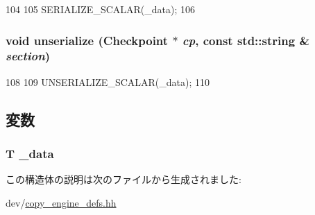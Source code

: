\begin{DoxyCode}
104     {
105         SERIALIZE_SCALAR(_data);
106     }
\end{DoxyCode}
\hypertarget{structCopyEngineReg_1_1Reg_af22e5d6d660b97db37003ac61ac4ee49}{
\subsubsection[{unserialize}]{\setlength{\rightskip}{0pt plus 5cm}void unserialize ({\bf Checkpoint} $\ast$ {\em cp}, \/  const std::string \& {\em section})}}
\label{structCopyEngineReg_1_1Reg_af22e5d6d660b97db37003ac61ac4ee49}



\begin{DoxyCode}
108     {
109         UNSERIALIZE_SCALAR(_data);
110     }
\end{DoxyCode}


\subsection{変数}
\hypertarget{structCopyEngineReg_1_1Reg_a57c5c9d30605c3947f4972fb48761bee}{
\subsubsection[{\_\-data}]{\setlength{\rightskip}{0pt plus 5cm}T {\bf \_\-data}}}
\label{structCopyEngineReg_1_1Reg_a57c5c9d30605c3947f4972fb48761bee}


この構造体の説明は次のファイルから生成されました:\begin{DoxyCompactItemize}
\item 
dev/\hyperlink{copy__engine__defs_8hh}{copy\_\-engine\_\-defs.hh}\end{DoxyCompactItemize}
